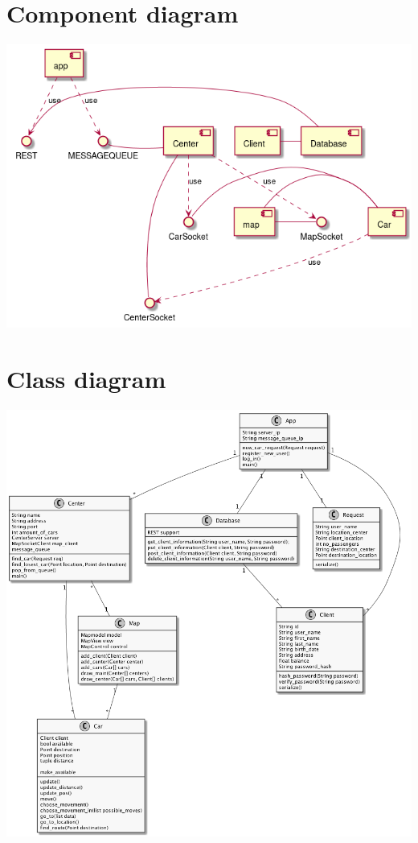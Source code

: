 \documentclass[a4paper]{article}
\begin{document}
\section*{Component diagram}
\includegraphics[width=1\textwidth]{../Diagrams/componentDiagram.png}

\section*{Class diagram}
\includegraphics[width=1\textwidth]{../Diagrams/classDiagram.png}
\end{document}
